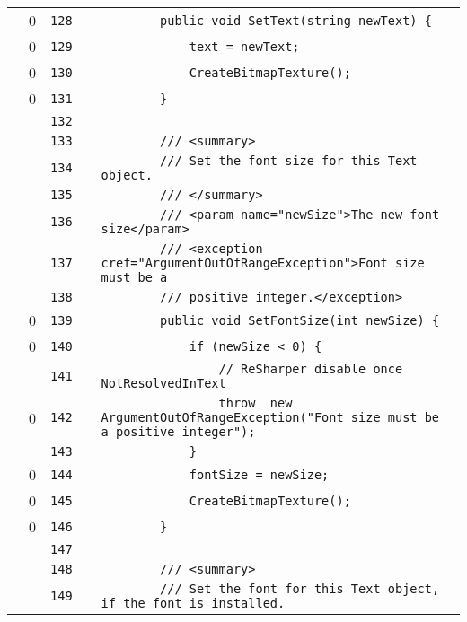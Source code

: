 \documentclass[a4paper,landscape,10pt]{article}
\begin{document}
\begin{longtable}[l]{lrrll}
\cellcolor{red} & 0 & \verb~128~ & & \verb~        public void SetText(string newText) {~\\
\cellcolor{red} & 0 & \verb~129~ & & \verb~            text = newText;~\\
\cellcolor{red} & 0 & \verb~130~ & & \verb~            CreateBitmapTexture();~\\
\cellcolor{red} & 0 & \verb~131~ & & \verb~        }~\\
\cellcolor{gray} &  & \verb~132~ & & \verb~~\\
\cellcolor{gray} &  & \verb~133~ & & \verb~        /// <summary>~\\
\cellcolor{gray} &  & \verb~134~ & & \verb~        /// Set the font size for this Text object.~\\
\cellcolor{gray} &  & \verb~135~ & & \verb~        /// </summary>~\\
\cellcolor{gray} &  & \verb~136~ & & \verb~        /// <param name="newSize">The new font size</param>~\\
\cellcolor{gray} &  & \verb~137~ & & \verb~        /// <exception cref="ArgumentOutOfRangeException">Font size must be a~\\
\cellcolor{gray} &  & \verb~138~ & & \verb~        /// positive integer.</exception>~\\
\cellcolor{red} & 0 & \verb~139~ & & \verb~        public void SetFontSize(int newSize) {~\\
\cellcolor{red} & 0 & \verb~140~ & & \verb~            if (newSize < 0) {~\\
\cellcolor{gray} &  & \verb~141~ & & \verb~                // ReSharper disable once NotResolvedInText~\\
\cellcolor{red} & 0 & \verb~142~ & & \verb~                throw  new ArgumentOutOfRangeException("Font size must be a positive integer");~\\
\cellcolor{gray} &  & \verb~143~ & & \verb~            }~\\
\cellcolor{red} & 0 & \verb~144~ & & \verb~            fontSize = newSize;~\\
\cellcolor{red} & 0 & \verb~145~ & & \verb~            CreateBitmapTexture();~\\
\cellcolor{red} & 0 & \verb~146~ & & \verb~        }~\\
\cellcolor{gray} &  & \verb~147~ & & \verb~~\\
\cellcolor{gray} &  & \verb~148~ & & \verb~        /// <summary>~\\
\cellcolor{gray} &  & \verb~149~ & & \verb~        /// Set the font for this Text object, if the font is installed.~\\

\end{longtable}
\end{document}
